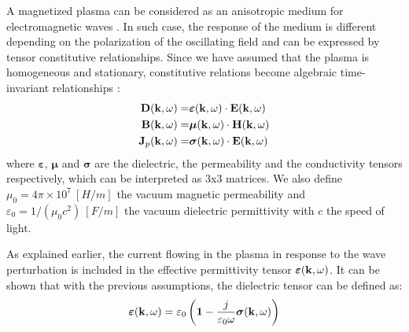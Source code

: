 A magnetized plasma can be considered as an anisotropic medium for electromagnetic waves . In such case, the response of the medium is different depending on the polarization of the oscillating field and can be expressed by tensor constitutive relationships. Since we have assumed that the plasma is homogeneous and stationary, constitutive relations become algebraic time-invariant relationships 
:
\begin{subequations}
	\begin{align}
		{\mathbf D}({\mathbf k}, \omega) 
		=& 
		\boldsymbol{\varepsilon}({\mathbf k}, \omega) \cdot {\mathbf E}({\mathbf k}, \omega) 
		\label{eq:disp_relation_kw_D}
		\\
		{\mathbf B}({\mathbf k}, \omega) 
		=& 
		\boldsymbol{\mu}({\mathbf k}, \omega) \cdot {\mathbf H}({\mathbf k}, \omega) 
		\label{eq:disp_relation_kw_B}
		\\
		{\mathbf J}_p({\mathbf k}, \omega) 
		=& 
		\boldsymbol{\sigma}({\mathbf k}, \omega) \cdot {\mathbf E}({\mathbf k}, \omega) 
		\label{eq:disp_relation_kw_J}
	\end{align}
	\label{eq:k-omegaDispersionRelation}
\end{subequations}%
where $\boldsymbol{\varepsilon}$, $\boldsymbol{\mu}$ and $\boldsymbol{\sigma}$ are the dielectric, the permeability and the conductivity tensors respectively, which can be interpreted as 3x3 matrices. We also define $\mu_0=4\pi\times10^7~[\si{H/m}]$ the vacuum magnetic permeability and $\varepsilon_0=1/(\mu_0 c^2)~[\si{F/m}]$ the vacuum dielectric permittivity with $c$ the speed of light. 

As explained earlier, the current flowing in the plasma in response to the wave perturbation is included in the effective permittivity tensor $\boldsymbol{\varepsilon}({\mathbf k}, \omega)$. It can be shown that with the previous assumptions, the dielectric tensor can be defined as:
\begin{equation}
	\boldsymbol{\varepsilon}({\mathbf k}, \omega) 
	= 
	\varepsilon_{0} 
	\left(
		\boldsymbol{1} - \frac{j}{\varepsilon_{0}\omega} \boldsymbol{\sigma}({\mathbf k}, \omega)
	\right)
\end{equation}

